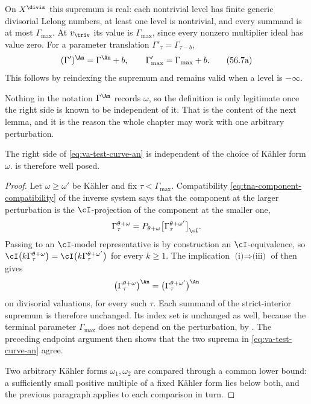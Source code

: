 On $X^{\divis}$ this supremum is real: each nontrivial level has
finite generic divisorial Lelong numbers, at least one level is nontrivial,
and every summand is at most $\Gamma_{\max}$. At $v_{\triv}$ its value
is $\Gamma_{\max}$, since every nonzero multiplier ideal has value zero.
For a parameter translation $\Gamma'_\tau=\Gamma_{\tau-b}$,
\[
 (\Gamma')^{\An}=\Gamma^{\An}+b,\qquad
 \Gamma'_{\max}=\Gamma_{\max}+b.
\tag{56.7a}\label{eq:va-parameter-translation}
\]
This follows by reindexing the supremum and remains valid when a level
is $-\infty$.

Nothing in the notation $\Gamma^{\An}$ records $\omega$, so the
definition is only legitimate once the right side is known to be
independent of it.  That is the content of the next lemma, and it is the
reason the whole chapter may work with one arbitrary perturbation.

\begin{lemma}
\label{lem:va-omega-independence}
The right side of \eqref{eq:va-test-curve-an} is independent of the choice
of K\"ahler form $\omega$.
 is therefore well posed.
\end{lemma}

\begin{proof}
Let $\omega\geq\omega'$ be K\"ahler and fix
$\tau<\Gamma_{\max}$. Compatibility
\eqref{eq:tna-component-compatibility} of the inverse system says that the
component at the larger perturbation is the $\cI$-projection of the
component at the smaller one,
\[
 \Gamma_\tau^{\theta+\omega}
 =P_{\theta+\omega}\bigl[\Gamma_\tau^{\theta+\omega'}\bigr]_{\cI}.
\]
Passing to an $\cI$-model representative is by construction an
$\cI$-equivalence, so
$\cI\bigl(k\Gamma_\tau^{\theta+\omega}\bigr)
  =\cI\bigl(k\Gamma_\tau^{\theta+\omega'}\bigr)$
for every $k\geq1$.  The implication
$\text{(i)}\Rightarrow\text{(iii)}$ of
 then gives
\[
 \bigl(\Gamma_\tau^{\theta+\omega}\bigr)^{\An}
 =\bigl(\Gamma_\tau^{\theta+\omega'}\bigr)^{\An}
\]
on divisorial valuations, for every such $\tau$. Each summand of the
strict-interior supremum is therefore unchanged. Its index set is
unchanged as well, because the terminal parameter
$\Gamma_{\max}$ does not depend on the perturbation, by
. The preceding endpoint argument then
shows that the two suprema in \eqref{eq:va-test-curve-an} agree.

Two arbitrary K\"ahler forms $\omega_1,\omega_2$ are compared through a
common lower bound: a sufficiently small positive multiple of a fixed
K\"ahler form lies below both, and the previous paragraph applies to each
comparison in turn.
\end{proof}

